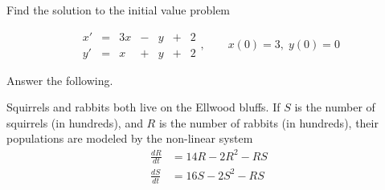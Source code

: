 \documentclass[addpoints,12pt]{exam}
\begin{document}
\newpage
\begin{questions}
 
 \question[10] Find the solution to the initial value problem
 
 $$\begin{array}{ccccccc}
  x' & = & 3x & - & y&+&2 \\
  y' & = & x & + & y&+&2
 \end{array},\qquad x(0)=3,\;y(0)=0$$
 
 \newpage
 
  \question[18] Answer the following.
 
 \newpage
 
 \question[12] Squirrels and rabbits both live on the Ellwood bluffs. If $S$ is the number of squirrels (in hundreds), and $R$ is the number of rabbits (in hundreds), their populations are modeled by the non-linear system
 \begin{align*}
  \frac{dR}{dt}&=14R-2R^2-RS\\
  \frac{dS}{dt}&=16S-2S^2-RS
 \end{align*}
\end{questions}
\end{document}
